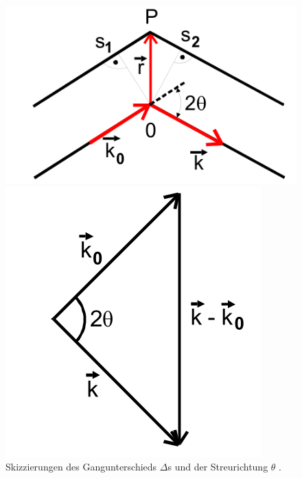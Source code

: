 \begin{figure}[h]
	\begin{minipage}[t]{0.45\textwidth}
		\includegraphics[width = \textwidth]{Abbildungen/streuung}
	\end{minipage}
	\begin{minipage}[t]{0.45\textwidth}
		\includegraphics[width = \textwidth]{Abbildungen/streuwinkel}	
	\end{minipage}
	\caption{ Skizzierungen des Gangunterschieds $\Delta$s und der Streurichtung $\theta$ \cite{Anleitung}. }
	\label{fig:streuung}
\end{figure}

